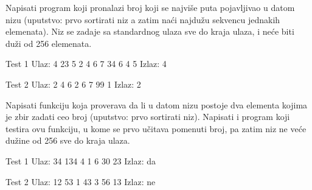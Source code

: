 \begin{Exercise}[label=503]
  Napisati program koji pronalazi broj koji se najviše puta
  pojavljivao u datom nizu (uputstvo: prvo sortirati niz a zatim
  naći najdužu sekvencu jednakih elemenata). Niz se zadaje sa
  standardnog ulaza sve do kraja ulaza, i neće biti duži od 256
  elemenata.
  
\begin{miditest}
\begin{test}{Test 1}
Ulaz:   4 23 5 2 4 6 7 34 6 4 5
Izlaz:  4
\end{test}
\end{miditest}
\begin{miditest}
\begin{test}{Test 2}
Ulaz:   2 4 6 2 6 7 99 1
Izlaz:  2
\end{test}
\end{miditest}
  
\end{Exercise}

\begin{Exercise}[label=504]
  Napisati funkciju koja proverava da li u datom nizu postoje dva
  elementa kojima je zbir zadati ceo broj (uputstvo: prvo sortirati
  niz). Napisati i program koji testira ovu funkciju, u kome se prvo
  učitava pomenuti broj, pa zatim niz ne veće dužine od 256
  sve do kraja ulaza.
  
\begin{miditest}
\begin{test}{Test 1}
Ulaz:   34 134 4 1 6 30 23
Izlaz:  da
\end{test}
\end{miditest}
\begin{miditest}
\begin{test}{Test 2}
Ulaz:   12 53 1 43 3 56 13
Izlaz:  ne
\end{test}
\end{miditest}
  
\end{Exercise}

